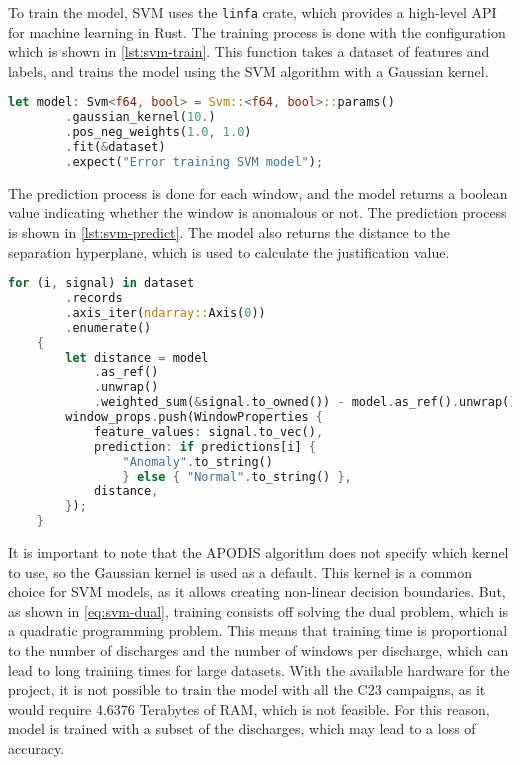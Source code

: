 To train the model, SVM uses the \texttt{linfa} crate, which provides a high-level API for machine learning in Rust. The training process is done with the configuration which is shown in \autoref{lst:svm-train}. This function takes a dataset of features and labels, and trains the model using the \ac{SVM} algorithm with a Gaussian kernel.

\begin{lstlisting}[language=Rust, caption={Training the \ac{SVM} model}, label={lst:svm-train}]
    let model: Svm<f64, bool> = Svm::<f64, bool>::params()
        .gaussian_kernel(10.)
        .pos_neg_weights(1.0, 1.0)
        .fit(&dataset)
        .expect("Error training SVM model");
\end{lstlisting}

The prediction process is done for each window, and the model returns a boolean value indicating whether the window is anomalous or not. The prediction process is shown in \autoref{lst:svm-predict}. The model also returns the distance to the separation hyperplane, which is used to calculate the justification value.

\begin{lstlisting}[language=Rust, caption={Prediction with the \ac{SVM} model}, label={lst:svm-predict}]
    for (i, signal) in dataset
        .records
        .axis_iter(ndarray::Axis(0))
        .enumerate() 
    {
        let distance = model
            .as_ref()
            .unwrap()
            .weighted_sum(&signal.to_owned()) - model.as_ref().unwrap().rho;
        window_props.push(WindowProperties {
            feature_values: signal.to_vec(),
            prediction: if predictions[i] { 
                "Anomaly".to_string() 
                } else { "Normal".to_string() },
            distance,
        });
    }
\end{lstlisting}

It is important to note that the \ac{APODIS} algorithm does not specify which kernel to use, so the Gaussian kernel is used as a default. This kernel is a common choice for \ac{SVM} models, as it allows creating non-linear decision boundaries. But, as shown in \autoref{eq:svm-dual}, training consists off solving the dual problem, which is a quadratic programming problem. This means that training time is proportional to the number of discharges and the number of windows per discharge, which can lead to long training times for large datasets. With the available hardware for the project, it is not possible to train the model with all the C23 campaigns, as it would require 4.6376 Terabytes of RAM, which is not feasible. For this reason, model is trained with a subset of the discharges, which may lead to a loss of accuracy.

